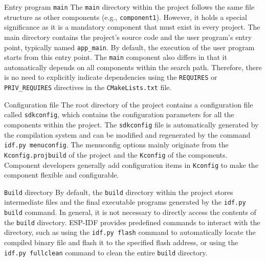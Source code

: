 \documentclass[a4paper,12pt]{book}
\begin{document}
\begin{term}{Entry program \texttt{main}}
    The \verb|main| directory within the project follows the same file structure as other components (e.g., \verb|component1|). However, it holds a special significance as it is a mandatory component that must exist in every project. The main directory contains the project’s source code and the user program’s entry point, typically named \verb|app_main|. By default, the execution of the user program starts from this entry point. The \verb|main| component also differs in that it automatically depends on all components within the search path. Therefore, there is no need to explicitly indicate dependencies using the \verb|REQUIRES| or \verb|PRIV_REQUIRES| directives in the \verb|CMakeLists.txt| file.
\end{term}

\begin{term}{Configuration file}
    The root directory of the project contains a configuration file called \verb|sdkconfig|, which contains the configuration parameters for all the components within the project. The \verb|sdkconfig| file is automatically generated by the compilation system and can be modified and regenerated by the command \verb|idf.py menuconfig|. The menuconfig options mainly originate from the \verb|Kconfig.projbuild| of the project and the \verb|Kconfig| of the components. Component developers generally add configuration items in \verb|Kconfig| to make the component flexible and configurable.
\end{term}

\begin{term}{\texttt{Build} directory}
    By default, the \verb|build| directory within the project stores intermediate files and the final executable programs generated by the \verb|idf.py build| command. In general, it is not necessary to directly access the contents of the \verb|build| directory. ESP-IDF provides predefined commands to interact with the directory, such as using the \verb|idf.py flash| command to automatically locate the compiled binary file and flash it to the specified flash address, or using the \verb|idf.py fullclean| command to clean the entire \verb|build| directory.
\end{term}
\end{document}
